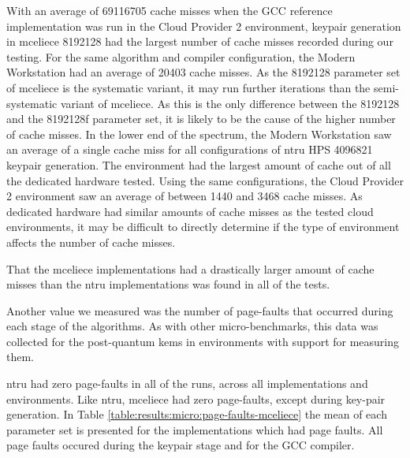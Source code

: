 

With an average of 69116705 cache misses when the GCC reference implementation was run in the Cloud Provider 2 environment, keypair generation in \gls{mceliece} 8192128 had the largest number of cache misses recorded during our testing. For the same algorithm and compiler configuration, the Modern Workstation had an average of 20403 cache misses. As the 8192128 parameter set of \gls{mceliece} is the systematic variant, it may run further iterations than the semi-systematic variant of \gls{mceliece}. As this is the only difference between the 8192128 and the 8192128f parameter set, it is likely to be the cause of the higher number of cache misses. In the lower end of the spectrum, the Modern Workstation saw an average of a single cache miss for all configurations of \gls{ntru} HPS 4096821 keypair generation. The environment had the largest amount of cache out of all the dedicated hardware tested. Using the same configurations, the Cloud Provider 2 environment saw an average of between 1440 and 3468 cache misses. As dedicated hardware had similar amounts of cache misses as the tested cloud environments, it may be difficult to directly determine if the type of environment affects the number of cache misses.

That the \gls{mceliece} implementations had a drastically larger amount of cache misses than the \gls{ntru} implementations was found in all of the tests.

\newpage
\noindent Another value we measured was the number of page-faults that occurred during each stage of the algorithms. As with other micro-benchmarks, this data was collected for the \gls{post-quantum} \glspl{kem} in environments with support for measuring them.

\gls{ntru} had zero page-faults in all of the runs, across all implementations and environments. Like \gls{ntru}, \gls{mceliece} had zero page-faults, except during key-pair generation. In Table \ref{table:results:micro:page-faults-mceliece} the mean of each parameter set is presented for the implementations which had page faults. All page faults occured during the keypair stage and for the GCC compiler.



